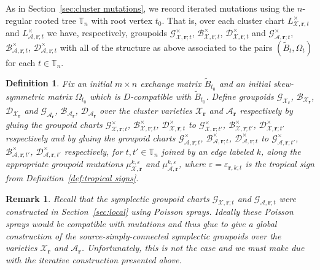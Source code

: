 \documentclass{amsart}
\newtheorem{definition}[theorem]{Definition}
\newtheorem{remark}[theorem]{Remark}
\numberwithin{equation}{section}
\newcommand{\bfr}{{\boldsymbol{r}}}
\newcommand{\cA}{\mathcal{A}}
\newcommand{\cB}{\mathcal{B}}
\newcommand{\cD}{\mathcal{D}}
\newcommand{\cG}{\mathcal{G}}
\newcommand{\cX}{\mathcal{X}}
\newcommand{\TT}{\mathbb{T}}
\begin{document}
As in Section~\ref{sec:cluster mutations}, we record iterated mutations using the $n$-regular rooted tree $\TT_n$ with root vertex $t_0$.
That is, over each cluster chart $L^\times_{\cX,\bfr;t}$ and $L^\times_{\cA,\bfr;t}$ we have, respectively, groupoids $\cG^\times_{\cX,\bfr;t}$, $\cB^\times_{\cX,\bfr;t}$, $\cD^\times_{\cX,\bfr;t}$ and $\cG^\times_{\cA,\bfr;t}$, $\cB^\times_{\cA,\bfr;t}$, $\cD^\times_{\cA,\bfr;t}$ with all of the structure as above associated to the pairs $(\tilde B_t,\Omega_t)$ for each $t\in\TT_n$.
\begin{definition}
  Fix an initial $m\times n$ exchange matrix $\tilde B_{t_0}$ and an initial skew-symmetric matrix $\Omega_{t_0}$ which is $D$-compatible with $\tilde B_{t_0}$.
  Define groupoids $\cG_{\cX_\bfr}$, $\cB_{\cX_\bfr}$, $\cD_{\cX_\bfr}$ and $\cG_{\cA_\bfr}$, $\cB_{\cA_\bfr}$, $\cD_{\cA_\bfr}$ over the cluster varieties $\cX_\bfr$ and $\cA_\bfr$ respectively by gluing the groupoid charts $\cG^\times_{\cX,\bfr;t}$, $\cB^\times_{\cX,\bfr;t}$, $\cD^\times_{\cX,\bfr;t}$ to $\cG^\times_{\cX,\bfr;t'}$, $\cB^\times_{\cX,\bfr;t'}$, $\cD^\times_{\cX,\bfr;t'}$ respectively and by gluing the groupoid charts $\cG^\times_{\cA,\bfr;t}$, $\cB^\times_{\cA,\bfr;t}$, $\cD^\times_{\cA,\bfr;t}$ to $\cG^\times_{\cA,\bfr;t'}$, $\cB^\times_{\cA,\bfr;t'}$, $\cD^\times_{\cA,\bfr;t'}$ respectively, for $t,t'\in\TT_n$ joined by an edge labeled $k$, along the appropriate groupoid mutations $\mu_{\cX,\bfr}^{k,\varepsilon}$ and $\mu_{\cA,\bfr}^{k,\varepsilon}$, where $\varepsilon=\varepsilon_{\bfr,k;t}$ is the tropical sign from Definition~\ref{def:tropical signs}.
\end{definition}
\begin{remark}
  Recall that the symplectic groupoid charts $\cG_{\cX,\bfr;t}$ and $\cG_{\cA,\bfr;t}$ were constructed in Section~\ref{sec:local} using Poisson sprays.
  Ideally these Poisson sprays would be compatible with mutations and thus glue to give a global construction of the source-simply-connected symplectic groupoids over the varieties $\cX_\bfr$ and $\cA_\bfr$.
  Unfortunately, this is not the case and we must make due with the iterative construction presented above.
\end{remark}
\end{document}
